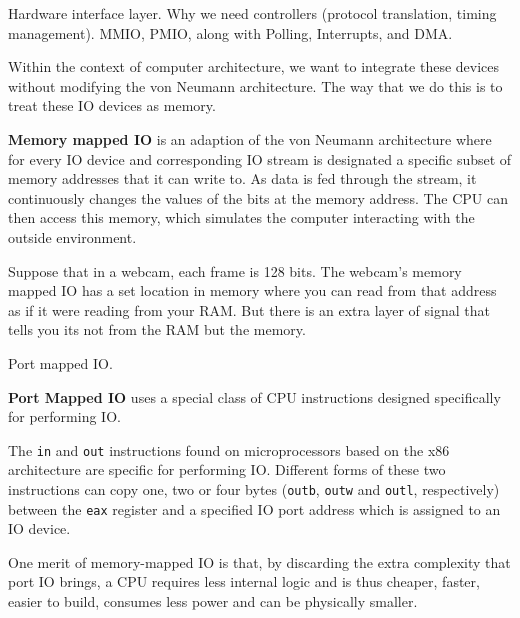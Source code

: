   Hardware interface layer. Why we need controllers (protocol translation, timing management). MMIO, PMIO, along with Polling, Interrupts, and DMA. 

  Within the context of computer architecture, we want to integrate these devices without modifying the von Neumann architecture. The way that we do this is to treat these IO devices as memory. 

  \begin{definition}
    \textbf{Memory mapped IO} is an adaption of the von Neumann architecture where for every IO device and corresponding IO stream is designated a specific subset of memory addresses that it can write to. As data is fed through the stream, it continuously changes the values of the bits at the memory address. The CPU can then access this memory, which simulates the computer interacting with the outside environment. 
  \end{definition}

  \begin{example}[Webcams]
    Suppose that in a webcam, each frame is 128 bits. The webcam's memory mapped IO has a set location in memory where you can read from that address as if it were reading from your RAM. But there is an extra layer of signal that tells you its not from the RAM but the memory. 
  \end{example}

  Port mapped IO. 

  \begin{definition}
    \textbf{Port Mapped IO} uses a special class of CPU instructions designed specifically for performing IO. 
  \end{definition}

  \begin{example}
    The \texttt{in} and \texttt{out} instructions found on microprocessors based on the x86 architecture are specific for performing IO. Different forms of these two instructions can copy one, two or four bytes (\texttt{outb}, \texttt{outw} and \texttt{outl}, respectively) between the \texttt{eax} register and a specified IO port address which is assigned to an IO device.
  \end{example}

  One merit of memory-mapped IO is that, by discarding the extra complexity that port IO brings, a CPU requires less internal logic and is thus cheaper, faster, easier to build, consumes less power and can be physically smaller. 


